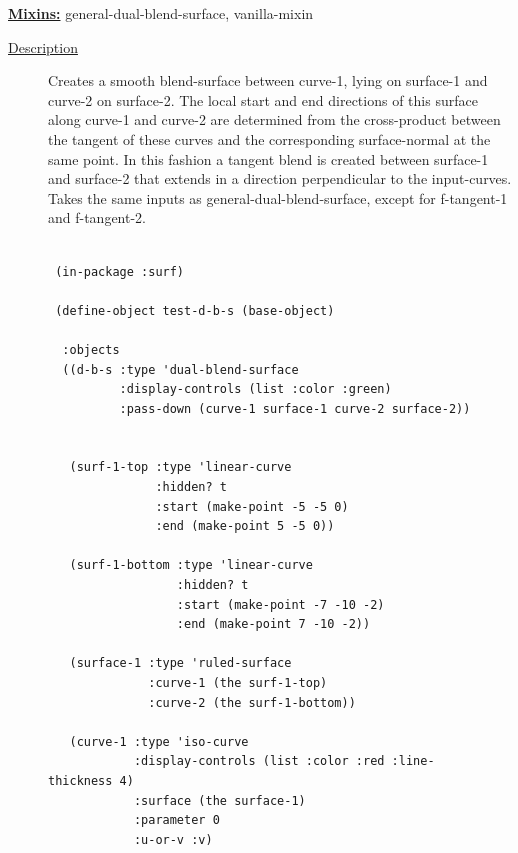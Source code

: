\documentclass [11pt]{book}
\begin{document}
\begin{itemize}
\textbf{
\underline{Mixins:}} general-dual-blend-surface, vanilla-mixin





\begin{description}

\item [
\underline{Description}]


Creates a smooth blend-surface between curve-1, lying on surface-1 and curve-2 on surface-2. The local start and end directions of this surface along curve-1 and curve-2 are determined from the cross-product between the tangent of these curves and the corresponding surface-normal at the same point. In this fashion a tangent blend is created between surface-1 and surface-2 that extends in a direction perpendicular to the input-curves. Takes the same inputs as general-dual-blend-surface, except for f-tangent-1 and f-tangent-2.



\end{description}




\begin{figure}
\begin{lrbox}{\boxedverb}
\begin{minipage}{\linewidth}
{\small

\begin{verbatim}

 (in-package :surf)

 (define-object test-d-b-s (base-object)
  
  :objects
  ((d-b-s :type 'dual-blend-surface
          :display-controls (list :color :green)
          :pass-down (curve-1 surface-1 curve-2 surface-2))
                                    
   
   (surf-1-top :type 'linear-curve
               :hidden? t
               :start (make-point -5 -5 0)
               :end (make-point 5 -5 0))
    
   (surf-1-bottom :type 'linear-curve
                  :hidden? t
                  :start (make-point -7 -10 -2)
                  :end (make-point 7 -10 -2))
    
   (surface-1 :type 'ruled-surface
              :curve-1 (the surf-1-top)
              :curve-2 (the surf-1-bottom))
    
   (curve-1 :type 'iso-curve
            :display-controls (list :color :red :line-thickness 4)
            :surface (the surface-1)
            :parameter 0
            :u-or-v :v)
    

\end{verbatim}}
\end{minipage}
\end{lrbox}
\end{figure}
\end{itemize}
\end{document}
